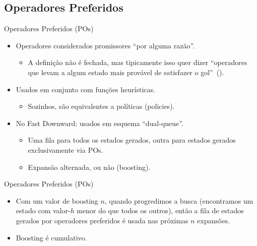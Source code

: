 \documentclass{beamer}
\begin{document}
\subsection{Operadores Preferidos}
\begin{frame}{Operadores Preferidos (POs)}
\begin{itemize}
\item \alert{Operadores} considerados \alert{promissores} ``por alguma razão''.
    \pause
  \begin{itemize}
  \item A definição não é fechada, mas tipicamente isso quer dizer ``operadores que levam a algum estado mais provável de satisfazer o gol''~(\cite{Helmert/2006,Richter.Helmert/2009}).
  \end{itemize}
  \pause
\item Usados em conjunto com funções heurísticas.
  \begin{itemize}
  \item Sozinhos, são equivalentes a políticas (policies).
  \end{itemize}
\pause
\item No Fast Downward: usados em esquema ``\alert{dual-queue}''.
  \begin{itemize}
  \item Uma fila para todos os estados gerados, outra para \alert{estados gerados exclusivamente via POs}.
  \item Expansão alternada, ou não (\alert{boosting}).
  \end{itemize}
\end{itemize}
\end{frame}

\begin{frame}{Operadores Preferidos (POs)}
\begin{itemize}
  \item Com um valor de \alert{boosting $n$}, quando progredimos a busca (encontramos um estado com valor-$h$ menor do que todos os outros), então a fila de estados gerados por operadores preferidos é usada nas \alert{próximas $n$ expansões}.
  \item Boosting é \alert{cumulativo}.
\end{itemize}
\end{frame}
\end{document}

